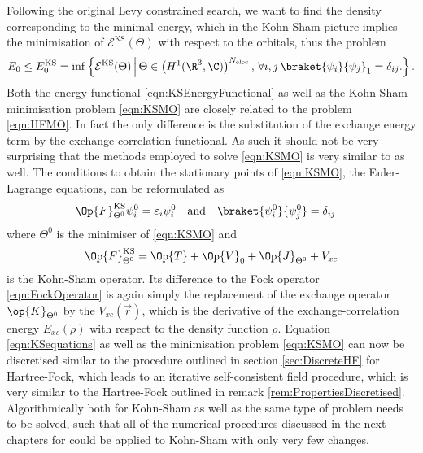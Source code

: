 Following the original Levy constrained search,
we want to find the density corresponding to the minimal energy,
which in the Kohn-Sham picture implies the minimisation
of $\mathcal{E}^\text{KS}(\Theta)$ with respect to the orbitals,
thus the problem
\begin{equation}
	E_0 \leq E_0^\text{KS}
	= \inf \left\{
		\mathcal{E}^\text{KS}(\Theta)
		\, \middle| \,
		\Theta \in \left(H^1(\R^3, \C)\right)^{\Nelec}, \,
		\forall i,j \,
		\braket{\psi_i}{\psi_j}_1 = \delta_{ij}.
	\right\}.
	\label{eqn:KSMO}
\end{equation}
Both the energy functional \eqref{eqn:KSEnergyFunctional}
as well as the Kohn-Sham minimisation problem \eqref{eqn:KSMO} are closely
related to the \HF problem \eqref{eqn:HFMO}.
In fact the only difference is the substitution of the exchange energy term
by the exchange-correlation functional.
As such it should not be very surprising that the methods employed to solve
\eqref{eqn:KSMO} is very similar to \HF as well.
The conditions to obtain the stationary points of \eqref{eqn:KSMO},
the Euler-Lagrange equations,
can be reformulated as
\begin{align}
	\label{eqn:KSequations}
	\Op{F}^\text{KS}_{\Theta^0} \psi_i^0 &= \varepsilon_i \psi_i^0
	&&\text{and}&
	\braket{\psi_i^0}{\psi_j^0} &= \delta_{ij}
\end{align}
where $\Theta^0$ is the minimiser of \eqref{eqn:KSMO} and
\begin{equation}
	\Op{F}_{\Theta^0}^\text{KS} = \Op{T} + \Op{V}_0 + \Op{J}_{\Theta^0} + V_{xc}
	\label{eqn:KohnShamOperator}
\end{equation}
is the Kohn-Sham operator.
Its difference to the Fock operator \eqref{eqn:FockOperator}
is again simply the replacement of the exchange operator $\op{K}_{\Theta^0}$
by the  $V_{xc}(\vec{r})$,
which is the derivative of the exchange-correlation energy $E_{xc}(\rho)$
with respect to the density function $\rho$.
Equation \eqref{eqn:KSequations} as well as the minimisation problem
\eqref{eqn:KSMO} can now be discretised
similar to the procedure outlined in section \vref{sec:DiscreteHF}
for Hartree-Fock,
which leads to an iterative self-consistent field procedure,
which is very similar to the Hartree-Fock \SCF outlined in
remark \vref{rem:PropertiesDiscretised}.
Algorithmically both for Kohn-Sham \DFT as well as \HF the same type of problem
needs to be solved, such that all of the numerical procedures
discussed in the next chapters for \HF could be applied to Kohn-Sham \DFT
with only very few changes.
